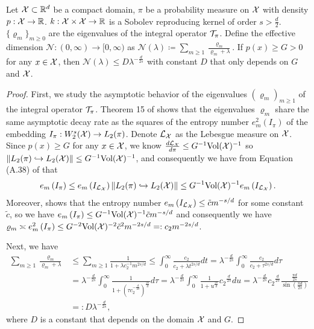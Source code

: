 \begin{lem}\label{lem:dof}
Let $\mathcal{X} \subset \mathbb{R}^d$ be a compact domain, $\pi$ be a probability measure on $\mathcal{X}$ with density $p:\mathcal{X} \to \mathbb{R}$. $k : \mathcal{X} \times \mathcal{X} \to \mathbb{R}$ is a Sobolev reproducing kernel of order $s > \frac{d}{2}$. 
$\{\varrho_m \}_{m \geq 0}$ are the eigenvalues of the integral operator $\mathcal{T}_\pi$.
Define the effective dimension $\mathcal{N}:(0, \infty) \rightarrow[0, \infty)$ as $\mathcal{N}(\lambda) \coloneq \sum_{m \geq 1} \frac{\varrho_m}{\varrho_m+\lambda}$. 
If $p(x) \geq G > 0$ for any $x \in \mathcal{X}$, then $ \mathcal{N}(\lambda) \leq D \lambda^{- \frac{d}{2s} }$ with constant $D$ that only depends on $G$ and $\mathcal{X}$.
\end{lem}
\begin{proof}
First, we study the asymptotic behavior of the eigenvalues $\left(\varrho_m \right)_{m \geq 1}$ of the integral operator $\mathcal{T}_\pi$. Theorem 15 of \cite{steinwart2009optimal} shows that the eigenvalues $\varrho_m$ share the same asymptotic decay rate as the squares of the entropy number $e_m^2\left( I_\pi \right)$ of the embedding $I_\pi: W_2^s(\mathcal{X}) \rightarrow L_2(\pi)$. 
Denote $\mathcal{L}_{\mathcal{X}}$ as the Lebesgue measure on $\mathcal{X}$.
Since $p(x) \geq G$ for any $x \in \mathcal{X}$, we know $\frac{d \mathcal{L}_{\mathcal{X}}}{d \pi} \leq G^{-1} \text{Vol}(\mathcal{X})^{-1}$ so $\| L_2(\pi) \hookrightarrow L_2(\mathcal{X}) \| \leq G^{-1} \text{Vol}(\mathcal{X})^{-1}$, and consequently we have from Equation (A.38) of \citet{steinwart2008support} that
\begin{align*}
    e_m \left( I_\pi \right) \leq e_m \left( I_{\mathcal{L}_{\mathcal{X}}} \right) \| L_2(\pi) \hookrightarrow L_2(\mathcal{X}) \| \leq G^{-1} \text{Vol}(\mathcal{X})^{-1} e_m \left( I_{\mathcal{L}_{\mathcal{X}}} \right) .
\end{align*}
Moreover, \citep[Equation 4 on p. 119]{edmunds1996function} shows that the entropy number $e_m\left( I_{\mathcal{L}_{\mathcal{X}}} \right) \leq \tilde{c} m^{-s / d}$ for some constant $\tilde{c}$, so we have $e_m \left( I_\pi \right) \leq G^{-1} \text{Vol}(\mathcal{X})^{-1} \tilde{c} m^{-s / d}$ and consequently we have $\varrho_m \asymp e_m^2\left( I_\pi \right) \leq G^{-2} \text{Vol}(\mathcal{X})^{-2} \tilde{c}^2 m^{-2s / d} =: c_2 m^{-2s / d}$.

Next, we have  
\begin{align*}
    \sum_{m \geq 1} \frac{\varrho_m}{\varrho_m+\lambda} &\leq \sum_{m \geq 1} \frac{1}{1+\lambda c_2^{-1} m^{2 s / d} } \leq \int_0^{\infty} \frac{c_2}{ c_2 + \lambda  t^{2 s / d} } dt = \lambda^{- \frac{d}{2s} } \int_0^{\infty} \frac{c_2}{ c_2 + \tau^{2 s / d} } d \tau \\
    &= \lambda^{- \frac{d}{2s} } \int_0^{\infty} \frac{1 }{1 + \left( \tau c_2^{-\frac{d}{2s}} \right)^{\frac{2s}{d}} } d \tau = \lambda^{- \frac{d}{2s} } \int_0^{\infty} \frac{1}{1 + u^{\frac{2s}{d}} } {c_2}^{\frac{d}{2s}} d u
    = \lambda^{- \frac{d}{2s} } {c_2}^{\frac{d}{2s}} 
    \frac{ \frac{\pi d}{2s} }{\sin \left( \frac{\pi d}{2s} \right)} \\
    &=: D \lambda^{- \frac{d}{2s} },
\end{align*}
where $D$ is a constant that depends on the domain $\mathcal{X}$ and $G$.
\end{proof}

